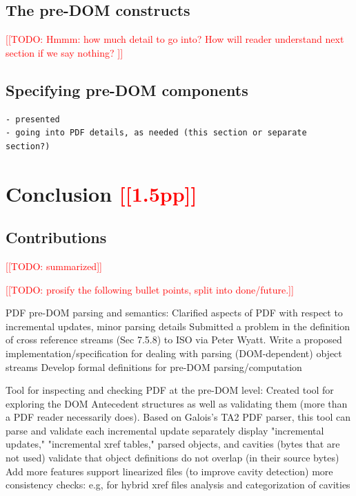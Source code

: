 \documentclass[conference,12pt]{IEEEtran}
\newcommand{\note}[1]{\noteYes{#1}}
\newcommand{\noteYes}[1]{\textcolor{red}{[[#1]]}}
\newcommand{\todo}[1]{\note{TODO: #1}}
\begin{document}
\subsection{The pre-DOM constructs}
\todo{Hmmm: how much detail to go into?
      How will reader understand next section if we say nothing?
}

\subsection{Specifying pre-DOM components}
\begin{lstlisting}[style=meta]
- presented
- going into PDF details, as needed (this section or separate section?)
\end{lstlisting}

\section{Conclusion \note{1.5pp}}
\label{sec:conclusion}

\subsection{Contributions}
\todo{summarized}

\todo{prosify the following bullet points, split into done/future.}

PDF pre-DOM parsing and semantics:
Clarified aspects of PDF with respect to incremental updates, minor parsing details
Submitted a problem in the definition of cross reference streams (Sec 7.5.8) to
ISO via Peter Wyatt.
Write a proposed implementation/specification for dealing with parsing (DOM-dependent) object streams
Develop formal definitions for pre-DOM parsing/computation

Tool for inspecting and checking PDF at the pre-DOM level:
Created tool for exploring the DOM Antecedent structures as well as validating them (more than a PDF reader necessarily does).  Based on Galois's TA2 PDF parser, this tool can
parse and validate each incremental update separately
display "incremental updates," "incremental xref tables," parsed objects, and cavities (bytes that are not used)
validate that object definitions do not overlap (in their source bytes)
Add more features
support linearized files (to improve cavity detection)
more consistency checks: e.g, for hybrid xref files
analysis and categorization of cavities
      
\end{document}
